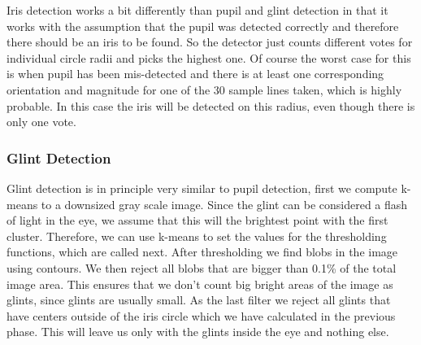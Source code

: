 Iris detection works a bit differently than pupil and glint detection in that it works with the assumption that the pupil was detected correctly and therefore there should be an iris to be found. So the detector just counts different votes for individual circle radii and picks the highest one. Of course the worst case for this is when pupil has been mis-detected and there is at least one corresponding orientation and magnitude for one of the 30 sample lines taken, which is highly probable. In this case the iris will be detected on this radius, even though there is only one vote.


\subsubsection{Glint Detection}

Glint detection is in principle very similar to pupil detection, first we compute k-means to a downsized gray scale image. Since the glint can be considered a flash of light in the eye, we assume that this will the brightest point with the first cluster. 
Therefore, we can use k-means to set the values for the thresholding functions, which are called next. After thresholding we find blobs in the image using contours. We then reject all blobs that are bigger than 0.1\% of the total image area. This ensures that we don't count big bright areas of the image as glints, since glints are usually small. As the last filter we reject all glints that have centers outside of the iris circle which we have calculated in the previous phase. This will leave us only with the glints inside the eye and nothing else.

